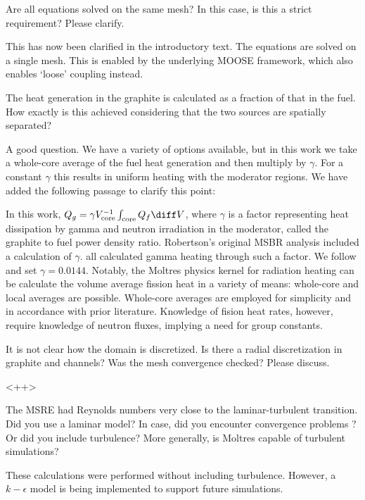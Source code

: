 \documentclass[answers,11pt]{exam}
\begin{document}
\begin{questions}
\question Are all equations solved on the same mesh? In this case, is this a strict requirement? Please clarify.
\begin{solution}
        This has now been clarified in the introductory text. The equations are
        solved on a single mesh. This is enabled by the underlying MOOSE
        framework, which also enables `loose' coupling instead.
\end{solution}

\question The heat generation in the graphite is calculated as a fraction of
that in the fuel. How exactly is this achieved considering that the two sources
are spatially separated?
\begin{solution}
        A good question. We have a variety of options available, but in this
        work we take a whole-core average of the fuel heat generation and then
        multiply by $\gamma$. For a constant $\gamma$ this results in uniform
        heating with the moderator regions. We have added the following passage
        to clarify this point:

        In this work, $Q_g = \gamma V_{\text{core}}^{-1} \int_{\text{core}}Q_f
        \diff V$, where $\gamma$ is a factor representing heat dissipation by
        gamma and neutron irradiation in the moderator, called the graphite to
        fuel power density ratio. Robertson's \cite{robertson_conceptual_1971}
        original \gls{MSBR} analysis included a calculation of $\gamma$.
        \cite{krepel_dyn3d-msr_2007,zhang_development_2009,cammi_multi-physics_2011}
        all calculated gamma heating through such a factor. We follow
        \cite{cammi_multi-physics_2011} and set $\gamma=0.0144$. Notably, the
        Moltres physics kernel for radiation heating can be calculate the volume
        average fission heat in a variety of means: whole-core and local
        averages are possible. Whole-core averages are employed for simplicity
        and in accordance with prior literature.  Knowledge of fision heat
        rates, however, require knowledge of neutron fluxes, implying a need for
        group constants.
\end{solution}

\question It is not clear how the domain is discretized. Is there a radial
discretization in graphite and channels? Was the mesh convergence checked?
Please discuss.
\begin{solution}
       <++>
\end{solution}

\question The MSRE had Reynolds numbers very close to the laminar-turbulent
transition. Did you use a laminar model? In case, did you encounter convergence
problems ?  Or did you include turbulence? More generally, is Moltres capable of
turbulent simulations?
\begin{solution}
        These calculations were performed without including turbulence. However,
        a $k-\epsilon$ model is being implemented to support future simulations.
\end{solution}


\end{questions}
\end{document}
